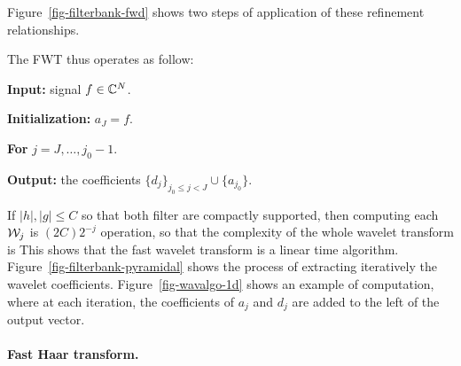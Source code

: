 Figure~\ref{fig-filterbank-fwd} shows two steps of application of these refinement relationships. 


The FWT thus operates as follow:
\begin{rs}
	\item \textbf{Input:} signal $f \in \mathbb{C}^N$.
	\item \textbf{Initialization:} $a_J = f$.
	\item \textbf{For} $j=J,\ldots,j_0-1$.
	\item \textbf{Output:} the coefficients $\{ d_j \}_{j_0 \leq j < J} \cup \{ a_{j_0} \}$.
\end{rs}

If $|h|,|g| \leq C$ so that both filter are compactly supported, then computing each $\mathcal{W}_j$ is $(2C) 2^{-j}$ operation, so that the complexity of the whole wavelet transform is 
This shows that the fast wavelet transform is a linear time algorithm.
%
Figure~\ref{fig-filterbank-pyramidal} shows the process of extracting iteratively the wavelet coefficients.
%
Figure~\ref{fig-wavalgo-1d} shows an example of computation, where at each iteration, the coefficients of $a_j$ and $d_j$ are added to the left of the output vector.




\paragraph{Fast Haar transform.}

